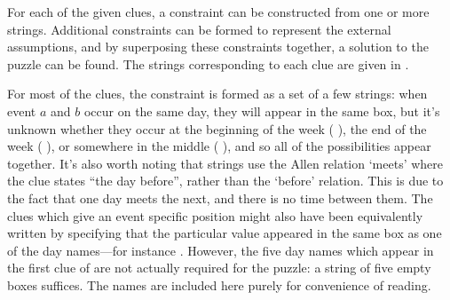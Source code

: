 \documentclass[a4paper,12pt,leqno]{article}
\newcommand{\vph}[1]{\vphantom{#1}}
\newcommand{\ebox}[1]{\fbox{$\vph{'(),}#1$}}
\newcommand{\EventString}[1]{%
	\renewcommand*{\do}[1]{\ebox{##1}}%
	\PipeParser{#1}%
}
\begin{document}
For each of the given clues, a constraint can be constructed from one or more strings. Additional constraints can be formed to represent the external assumptions, and by superposing these constraints together, a solution to the puzzle can be found. The strings corresponding to each clue are given in .

For most of the clues, the constraint is formed as a set of a few strings: when event $a$ and $b$ occur on the same day, they will appear in the same box, but it's unknown whether they occur at the beginning of the week (\EventString{a,b|{}}), the end of the week (\EventString{{}|a,b}), or somewhere in the middle (\EventString{{}|a,b|{}}), and so all of the possibilities appear together. It's also worth noting that strings use the Allen relation `meets' where the clue states ``the day before'', rather than the `before' relation. This is due to the fact that one day meets the next, and there is no time between them. The clues which give an event specific position might also have been equivalently written by specifying that the particular value appeared in the same box as one of the day names---for instance \EventString{mon,freezing}. However, the five day names which appear in the first clue of  are not actually required for the puzzle: a string of five empty boxes suffices. The names are included here purely for convenience of reading.
\end{document}
